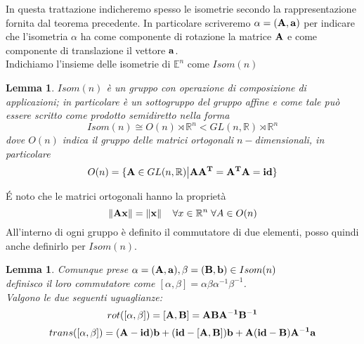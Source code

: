 \documentclass[12pt,a4paper]{book}
\newtheorem{lemma}[theorem]{Lemma}
\begin{document}
In questa trattazione indicheremo spesso le isometrie secondo la rappresentazione fornita dal teorema precedente. In particolare scriveremo $\alpha = ( \vb{A, a})  $ per indicare che l'isometria $\alpha$ ha come componente di rotazione la matrice $\vb{A}$ e come componente di translazione il vettore $\vb{a}$. \\
Indichiamo l'insieme delle isometrie di  $\mathbb{E}^{n} $ come $Isom(n)$
\begin{lemma}
$Isom(n)$ è un gruppo con operazione di composizione di applicazioni; in particolare è un sottogruppo del gruppo affine e come tale può essere scritto come prodotto semidiretto nella forma
\[ Isom(n) \cong   O(n) \rtimes \mathbb{R}^{n} <  GL(n, \mathbb{R}) \rtimes\mathbb{R}^{n} 
\]
dove $O(n)$ indica il gruppo delle matrici ortogonali $n-$dimensionali, in particolare 
\[ O(n) = \{ \vb{A} \in GL(n, \mathbb{R}) \big| \vb{A A^{T}} = \vb{A^{T} A} = \vb{id} \}\]
\end{lemma}
\'E noto che le matrici ortogonali hanno la proprietà
\[ \norm{\vb{Ax}} = \norm{\vb{x}}   \; \; \; \; \forall x \in \mathbb{R}^n \; \forall A \in O(n)\]
All'interno di ogni gruppo è definito il commutatore di due elementi, posso quindi anche definirlo per $Isom(n)$.
\begin{lemma}
	Comunque prese  $ \alpha = (\vb{A,a}), \beta = (\vb{B,b}) \in Isom(n)$\\
	definisco il loro commutatore come  $ [ \alpha , \beta] = \alpha \beta \alpha^{-1} \beta^{-1}$. \\
Valgono le due seguenti uguaglianze:
\begin{equation}
rot([ \alpha	, \beta ]) = \vb{[A, B]} = \vb{ABA^{-1}B^{-1}}
\end{equation}  
\begin{equation}
trans([ \alpha	, \beta ]) = \vb{(A-id)b+(id-[A,B])b+A(id-B)A^{-1}a }
\end{equation} 
\end{lemma}
\end{document}
